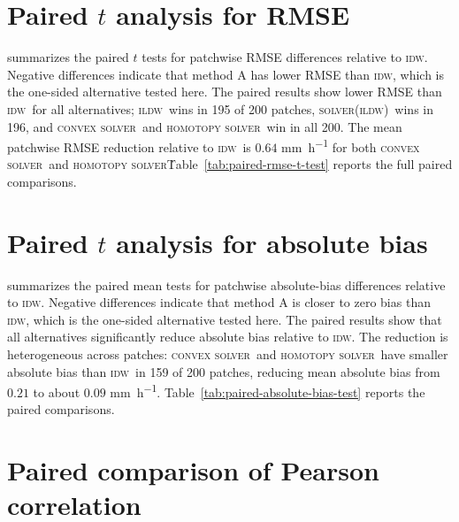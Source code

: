 \documentclass[a4paper,fleqn]{cas-sc}
\DeclareRobustCommand{\IDW}{\textsc{idw}}
\DeclareRobustCommand{\ILDW}{\textsc{ildw}}
\DeclareRobustCommand{\solverILDW}{\textsc{solver(ildw)}}
\DeclareRobustCommand{\solverConvex}{\textsc{convex solver}}
\DeclareRobustCommand{\solverHomotopy}{\textsc{homotopy solver}}
\DeclareRobustCommand{\ConvexSolver}{\solverConvex}
\DeclareRobustCommand{\Homotopy}{\solverHomotopy}
\begin{document}
\section*{Paired $t$ analysis for RMSE}
 summarizes the paired $t$ tests for patchwise RMSE differences relative to \IDW. Negative differences indicate that method A has lower RMSE than \IDW, which is the one-sided alternative tested here. The paired results show lower RMSE than \IDW\ for all alternatives; \ILDW\ wins in 195 of 200 patches, \solverILDW\ wins in 196, and \ConvexSolver\ and \Homotopy\ win in all 200. The mean patchwise RMSE reduction relative to \IDW\ is $0.64$ \si{\milli\meter\per\hour} for both \ConvexSolver\ and \Homotopy\. Table~\ref{tab:paired-rmse-t-test} reports the full paired comparisons.




\section*{Paired $t$ analysis for absolute bias}

 summarizes the paired mean tests for patchwise absolute-bias differences relative to \IDW. Negative differences indicate that method A is closer to zero bias than \IDW, which is the one-sided alternative tested here. The paired results show that all alternatives significantly reduce absolute bias relative to \IDW. The reduction is heterogeneous across patches: \ConvexSolver\ and \Homotopy\ have smaller absolute bias than \IDW\ in 159 of 200 patches, reducing mean absolute bias from $0.21$ to about $0.09$ \si{\milli\meter\per\hour}. Table~\ref{tab:paired-absolute-bias-test} reports the paired comparisons.



\section*{Paired comparison of Pearson correlation}
\end{document}
